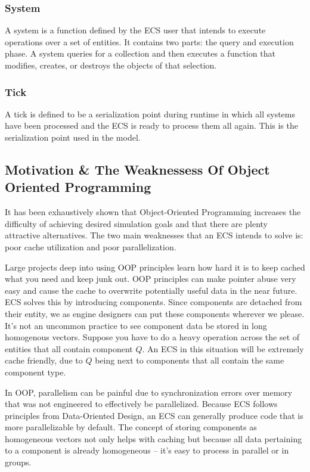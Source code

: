 \subsubsection{System}
    A system is a function defined by the ECS user that intends to execute operations over a set of entities. It 
    contains two parts: the query and execution phase. A system queries for a collection and then executes a function 
    that modifies, creates, or destroys the objects of that selection.

\subsubsection{Tick}
    A tick is defined to be a serialization point during runtime in which all systems have been processed and the ECS is
    ready to process them all again. This is the serialization point used in the model.

\subsection{Motivation \& The Weaknessess Of Object Oriented Programming}

It has been exhaustively shown that Object-Oriented Programming increases the difficulty of achieving desired simulation goals and that there are plenty attractive alternatives. The two main weaknesses that an ECS intends to solve is: poor cache utilization and poor parallelization.\cite{RomeoPHD}

Large projects deep into using OOP principles learn how hard it is to keep cached what you need and keep junk out. OOP principles can make pointer abuse very easy and cause the cache to overwrite potentially useful data in the near future. ECS solves this by introducing components. Since components are detached from their entity, we as engine designers can put these components wherever we please. It's not an uncommon practice to see component data be stored in long homogenous vectors. Suppose you have to do a heavy operation across the set of entities that all contain component $Q$. An ECS in this situation will be extremely cache friendly, due to $Q$ being next to components that all contain the same component type.

In OOP, parallelism can be painful due to synchronization errors over memory that was not engineered to effectively be
parallelized. Because ECS follows principles from Data-Oriented Design, an ECS can generally produce code that is more
parallelizable by default\cite{RomeoPHD}. The concept of storing components as homogeneous vectors not only helps with caching but because all data pertaining to a component is already homogeneous -- it's easy to process in parallel or in groups. \cite{Wiebusch2012}\cite{SanderMertensECS}

